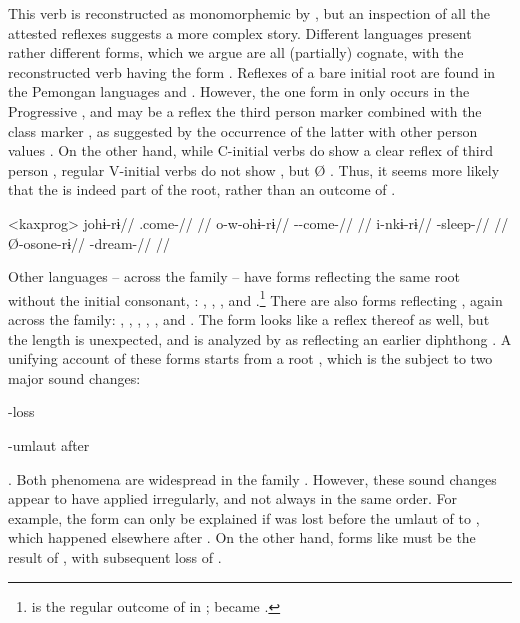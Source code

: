 This verb is reconstructed as monomorphemic  by \textcite[30]{gildea2007greenberg}, but an inspection of all the attested reflexes  suggests a more complex story.
Different languages present rather different forms, which we argue are all (partially) cognate, with the reconstructed \PC verb having the form .
Reflexes of a bare initial root  are found in the Pemongan languages and \kaxui.
However, the one form in \kaxui only occurs in the Progressive , and  may be a reflex the \settwo third person marker  combined with  the  class marker , as suggested by the occurrence of the latter with other person values .
On the other hand, while C-initial verbs do show a clear reflex of third person  , regular V-initial verbs do not show , but Ø .
Thus, it seems more likely that the  is indeed part of the root, rather than an outcome of .

\pex<kaxprog>\kaxui {}
\begingl
\gla johɨ-rɨ//
\glb {}.come-//
\glft {}//
\endgl
{}
\begingl
\gla o-w-ohɨ-rɨ//
\glb {}--come-//
\glft {}//
\endgl
{}
\begingl
\gla i-nkɨ-rɨ//
\glb {}-sleep-//
\glft {}//
\endgl
{}
\begingl
\gla Ø-osone-rɨ//
\glb {}-dream-//
\glft {}//
\endgl
\xe

Other languages -- across the family -- have forms reflecting the same root without the initial consonant, : \kalina, \panare, \yawarana, and \uxc.\footnote{ is the regular outcome of  in \uxc;  became  \parencite[176]{meira2005southern}.}
There are also forms reflecting , again across the family: \kaxui, \arara, \trio, \carijo, \maqui, and \mapoyo.
The \akuriyo form  looks like a reflex thereof as well, but the length is unexpected, and is analyzed by \textcite[]{meira1998proto} as reflecting an earlier diphthong .
A unifying account of these forms starts from a root , which is the subject to two major sound changes: \begin{inlinelist}
 \item {}-loss
 \item {}-umlaut after 
 \end{inlinelist}.
Both phenomena are widespread in the family \parencite{meira2010origin}.
However, these sound changes appear to have applied irregularly, and not always in the same order.
For example, the \kalina form  can only be explained if  was lost before the umlaut of  to , which happened elsewhere after .
On the other hand, forms like \maqui {} must be the result of , with subsequent loss of .

